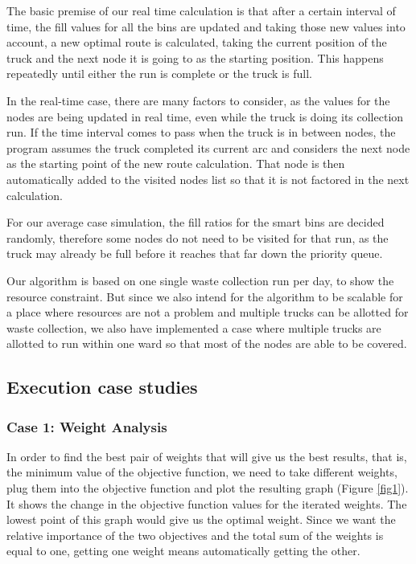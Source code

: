 \documentclass[12pt]{article}
\begin{document}
The basic premise of our real time calculation is that after a certain interval of time, the fill values for all the bins are updated and taking those new values into account, a new optimal route is calculated, taking the current position of the truck and the next node it is going to as the starting position. This happens repeatedly until either the run is complete or the truck is full.

In the real-time case, there are many factors to consider, as the values for the nodes are being updated in real time, even while the truck is doing its collection run. If the time interval comes to pass when the truck is in between nodes, the program assumes the truck completed its current arc and considers the next node as the starting point of the new route calculation. That node is then automatically added to the visited nodes list so that it is not factored in the next calculation.

For our average case simulation, the fill ratios for the smart bins are decided randomly, therefore some nodes do not need to be visited for that run, as the truck may already be full before it reaches that far down the priority queue.

Our algorithm is based on one single waste collection run per day, to show the resource constraint. But since we also intend for the algorithm to be scalable for a place where resources are not a problem and multiple trucks can be allotted for waste collection, we also have implemented a case where multiple trucks are allotted to run within one ward so that most of the nodes are able to be covered.
\subsection{Execution case studies}
\subsubsection*{Case 1: Weight Analysis}
In order to find the best pair of weights that will give us the best results, that is, the minimum value of the objective function, we need to take different weights, plug them into the objective function and plot the resulting graph (Figure \ref{fig1}). It shows the change in the objective function values for the iterated weights. The lowest point of this graph would give us the optimal weight. Since we want the relative importance of the two objectives and the total sum of the weights is equal to one, getting one weight means automatically getting the other.
\end{document}
